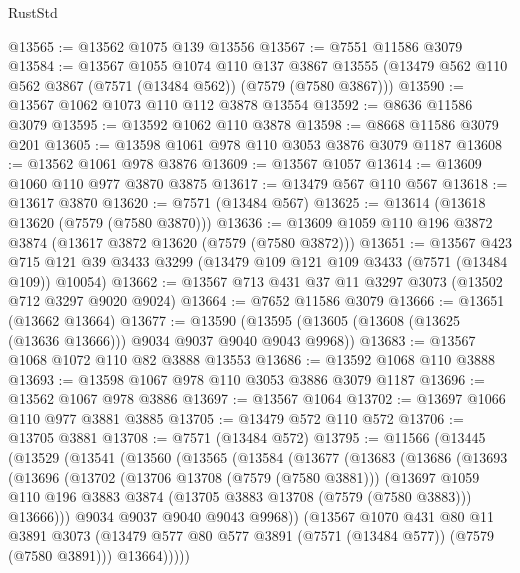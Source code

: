 \begin{lexlean}{RustStd}
\begin{coremodule}
@13565 := @13562 @1075 @139 @13556
@13567 := @7551 @11586 @3079
@13584 := @13567
    @1055
    @1074
    @110
    @137
    @3867
    @13555
    (@13479 @562 @110 @562 @3867 (@7571 (@13484 @562)) (@7579 (@7580 @3867)))
@13590 := @13567 @1062 @1073 @110 @112 @3878 @13554
@13592 := @8636 @11586 @3079
@13595 := @13592 @1062 @110 @3878
@13598 := @8668 @11586 @3079 @201
@13605 := @13598 @1061 @978 @110 @3053 @3876 @3079 @1187
@13608 := @13562 @1061 @978 @3876
@13609 := @13567 @1057
@13614 := @13609 @1060 @110 @977 @3870 @3875
@13617 := @13479 @567 @110 @567
@13618 := @13617 @3870
@13620 := @7571 (@13484 @567)
@13625 := @13614 (@13618 @13620 (@7579 (@7580 @3870)))
@13636 := @13609 @1059 @110 @196 @3872 @3874 (@13617 @3872 @13620 (@7579 (@7580 @3872)))
@13651 := @13567
    @423
    @715
    @121
    @39
    @3433
    @3299
    (@13479 @109 @121 @109 @3433 (@7571 (@13484 @109)) @10054)
@13662 := @13567 @713 @431 @37 @11 @3297 @3073 (@13502 @712 @3297 @9020 @9024)
@13664 := @7652 @11586 @3079
@13666 := @13651 (@13662 @13664)
@13677 := @13590 (@13595 (@13605 (@13608 (@13625 (@13636 @13666))) @9034 @9037 @9040 @9043 @9968))
@13683 := @13567 @1068 @1072 @110 @82 @3888 @13553
@13686 := @13592 @1068 @110 @3888
@13693 := @13598 @1067 @978 @110 @3053 @3886 @3079 @1187
@13696 := @13562 @1067 @978 @3886
@13697 := @13567 @1064
@13702 := @13697 @1066 @110 @977 @3881 @3885
@13705 := @13479 @572 @110 @572
@13706 := @13705 @3881
@13708 := @7571 (@13484 @572)
@13795 := @11566
    (@13445
      (@13529
        (@13541
          (@13560
            (@13565
              (@13584
                (@13677
                  (@13683
                    (@13686
                      (@13693
                        (@13696
                          (@13702
                            (@13706 @13708 (@7579 (@7580 @3881)))
                            (@13697
                              @1059
                              @110
                              @196
                              @3883
                              @3874
                              (@13705 @3883 @13708 (@7579 (@7580 @3883)))
                              @13666)))
                        @9034
                        @9037
                        @9040
                        @9043
                        @9968))
                    (@13567
                      @1070
                      @431
                      @80
                      @11
                      @3891
                      @3073
                      (@13479 @577 @80 @577 @3891 (@7571 (@13484 @577)) (@7579 (@7580 @3891)))
                      @13664)))))

\end{coremodule}
\end{lexlean}
